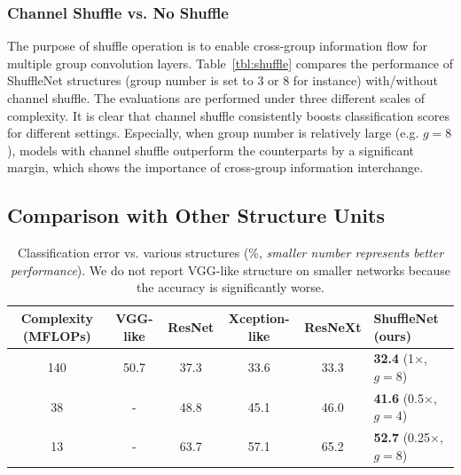 \documentclass[10pt,twocolumn,letterpaper]{article}
\begin{document}
\subsubsection{Channel Shuffle vs. No Shuffle}
\label{sec:shuffle}

The purpose of shuffle operation is to enable cross-group information flow for multiple group convolution layers. Table~\ref{tbl:shuffle} compares the performance of ShuffleNet structures (group number is set to 3 or 8 for instance) with/without channel shuffle. The evaluations are performed under three different scales of complexity. It is clear that channel shuffle consistently boosts classification scores for different settings. Especially, when group number is relatively large (e.g. $g=8$), models with channel shuffle outperform the counterparts by a significant margin, which shows the importance of cross-group information interchange.

\subsection{Comparison with Other Structure Units}
\label{sec:compother}


\begin{table}[ht]
	\begin{center}
		\begin{tabular}{c|c|c|c|c|l}
			\hline
			Complexity (MFLOPs) & VGG-like & ResNet & Xception-like & ResNeXt & ShuffleNet (ours) \\
			\hline
			\hline
			140 & 50.7 & 37.3 & 33.6 & 33.3 & \textbf{32.4} (1$\times$, $g=8$) \\
			38 & - & 48.8 & 45.1 & 46.0 & \textbf{41.6} (0.5$\times$, $g=4$) \\
			13 & - & 63.7 & 57.1 & 65.2 & \textbf{52.7} (0.25$\times$, $g=8$) \\
			\hline
		\end{tabular}
	\end{center}
	\caption{Classification error vs. various structures (\%, \emph{smaller number represents better performance}). We do not report VGG-like structure on smaller networks because the accuracy is significantly worse.}
	\label{tbl:structues}
\end{table}
\end{document}
